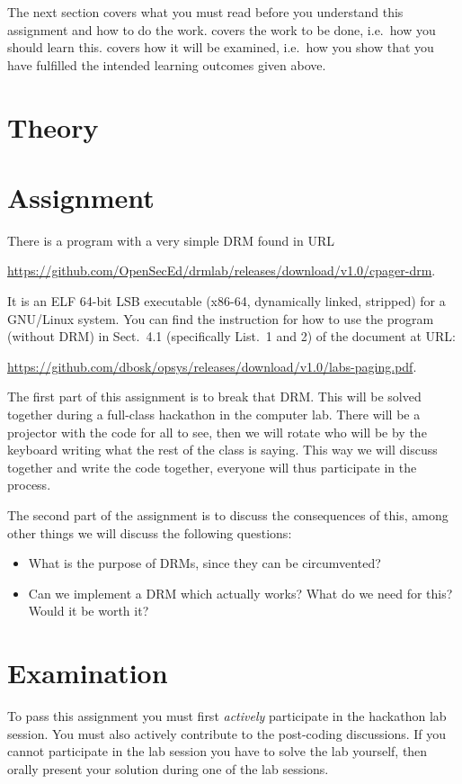 The next section covers what you must read before you understand this 
assignment and how to do the work.
 covers the work to be done, i.e.~how you should learn this.
 covers how it will be examined, i.e.~how you show that you have 
fulfilled the intended learning outcomes given above.


\section{Theory}
\label{sec:reading}



\section{Assignment}
\label{sec:tasks}
There is a program with a very simple \ac{DRM} found in URL
\begin{center}
  \url{https://github.com/OpenSecEd/drmlab/releases/download/v1.0/cpager-drm}.
\end{center}
It is an ELF 64-bit LSB executable (x86-64, dynamically linked, stripped) for 
a GNU/Linux system.
You can find the instruction for how to use the program (without \ac{DRM}) in 
Sect.~4.1 (specifically List.~1 and 2) of the document at URL\@:
\begin{center}
  \url{https://github.com/dbosk/opsys/releases/download/v1.0/labs-paging.pdf}.
\end{center}
The first part of this assignment is to break that \ac{DRM}.
This will be solved together during a full-class hackathon in the computer lab.
There will be a projector with the code for all to see, then we will rotate who 
will be by the keyboard writing what the rest of the class is saying.
This way we will discuss together and write the code together, everyone will 
thus participate in the process.

The second part of the assignment is to discuss the consequences of this, among 
other things we will discuss the following questions:
\begin{itemize}
  \item What is the purpose of \acp{DRM}, since they can be circumvented?
  \item Can we implement a \ac{DRM} which actually works?
    What do we need for this?
    Would it be worth it?
\end{itemize}


\section{Examination}
\label{sec:exam}
To pass this assignment you must first \emph{actively} participate in the 
hackathon lab session.
You must also actively contribute to the post-coding discussions.
If you cannot participate in the lab session you have to solve the lab 
yourself, then orally present your solution during one of the lab sessions.


